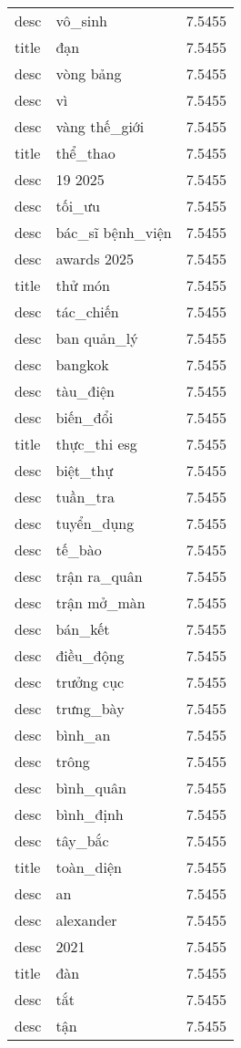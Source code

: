 \documentclass{article}
\begin{document}
\begin{tabular}{lll}
desc & vô\_sinh & 7.5455\\
title & đạn & 7.5455\\
desc & vòng bảng & 7.5455\\
desc & vì & 7.5455\\
desc & vàng thế\_giới & 7.5455\\
title & thể\_thao & 7.5455\\
desc & 19 2025 & 7.5455\\
desc & tối\_ưu & 7.5455\\
desc & bác\_sĩ bệnh\_viện & 7.5455\\
desc & awards 2025 & 7.5455\\
title & thử món & 7.5455\\
desc & tác\_chiến & 7.5455\\
desc & ban quản\_lý & 7.5455\\
desc & bangkok & 7.5455\\
desc & tàu\_điện & 7.5455\\
desc & biến\_đổi & 7.5455\\
title & thực\_thi esg & 7.5455\\
desc & biệt\_thự & 7.5455\\
desc & tuần\_tra & 7.5455\\
desc & tuyển\_dụng & 7.5455\\
desc & tế\_bào & 7.5455\\
desc & trận ra\_quân & 7.5455\\
desc & trận mở\_màn & 7.5455\\
desc & bán\_kết & 7.5455\\
desc & điều\_động & 7.5455\\
desc & trưởng cục & 7.5455\\
desc & trưng\_bày & 7.5455\\
desc & bình\_an & 7.5455\\
desc & trông & 7.5455\\
desc & bình\_quân & 7.5455\\
desc & bình\_định & 7.5455\\
desc & tây\_bắc & 7.5455\\
title & toàn\_diện & 7.5455\\
desc & an & 7.5455\\
desc & alexander & 7.5455\\
desc & 2021 & 7.5455\\
title & đàn & 7.5455\\
desc & tắt & 7.5455\\
desc & tận & 7.5455\\

\end{tabular}
\end{document}
